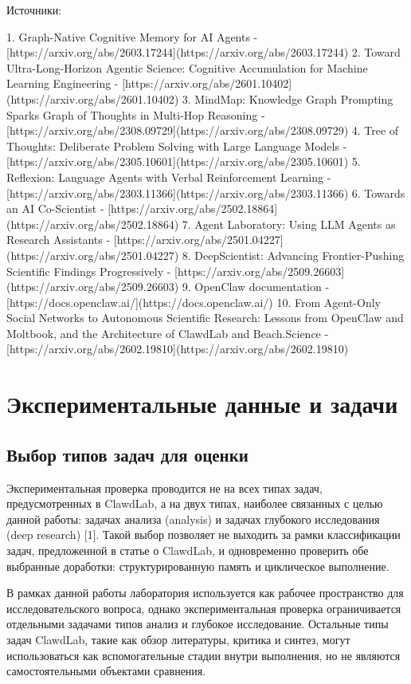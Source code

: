 Источники:

1. Graph-Native Cognitive Memory for AI Agents - [https://arxiv.org/abs/2603.17244](https://arxiv.org/abs/2603.17244)
2. Toward Ultra-Long-Horizon Agentic Science: Cognitive Accumulation for Machine Learning Engineering - [https://arxiv.org/abs/2601.10402](https://arxiv.org/abs/2601.10402)
3. MindMap: Knowledge Graph Prompting Sparks Graph of Thoughts in Multi-Hop Reasoning - [https://arxiv.org/abs/2308.09729](https://arxiv.org/abs/2308.09729)
4. Tree of Thoughts: Deliberate Problem Solving with Large Language Models - [https://arxiv.org/abs/2305.10601](https://arxiv.org/abs/2305.10601)
5. Reflexion: Language Agents with Verbal Reinforcement Learning - [https://arxiv.org/abs/2303.11366](https://arxiv.org/abs/2303.11366)
6. Towards an AI Co-Scientist - [https://arxiv.org/abs/2502.18864](https://arxiv.org/abs/2502.18864)
7. Agent Laboratory: Using LLM Agents as Research Assistants - [https://arxiv.org/abs/2501.04227](https://arxiv.org/abs/2501.04227)
8. DeepScientist: Advancing Frontier-Pushing Scientific Findings Progressively - [https://arxiv.org/abs/2509.26603](https://arxiv.org/abs/2509.26603)
9. OpenClaw documentation - [https://docs.openclaw.ai/](https://docs.openclaw.ai/)
10. From Agent-Only Social Networks to Autonomous Scientific Research: Lessons from OpenClaw and Moltbook, and the Architecture of ClawdLab and Beach.Science - [https://arxiv.org/abs/2602.19810](https://arxiv.org/abs/2602.19810)


\section{Экспериментальные данные и задачи}

\subsection{Выбор типов задач для оценки}

Экспериментальная проверка проводится не на всех типах задач, предусмотренных в ClawdLab, а на двух типах, наиболее связанных с целью данной работы: задачах анализа (analysis) и задачах глубокого исследования (deep research) [1]. Такой выбор позволяет не выходить за рамки классификации задач, предложенной в статье о ClawdLab, и одновременно проверить обе выбранные доработки: структурированную память и циклическое выполнение.

В рамках данной работы лаборатория используется как рабочее пространство для исследовательского вопроса, однако экспериментальная проверка ограничивается отдельными задачами типов анализ и глубокое исследование. Остальные типы задач ClawdLab, такие как обзор литературы, критика и синтез, могут использоваться как вспомогательные стадии внутри выполнения, но не являются самостоятельными объектами сравнения.

